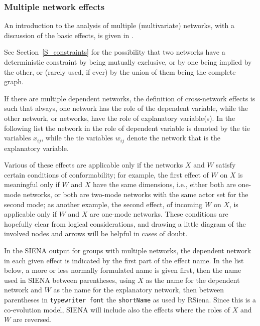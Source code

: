 \documentclass[a4paper,fleqn,11pt]{article}
\newcommand{\+}{\, + \,}
\newcommand{\rs}{{\sf RSiena}}
\newcommand{\SI}{{\sf SIENA }}
\begin{document}
\subsubsection{Multiple network effects}
\label{S_MultiNet}

An introduction to the analysis of multiple (multivariate) networks,
with a discussion of the basic effects, is given in \citet{SLT2013}.

See Section~\ref{S_constraints} for the possibility that two networks
have a deterministic constraint by being mutually exclusive,
or by one being implied by the other, or (rarely used, if ever)
by the union of them being the complete graph.

If there are multiple dependent networks, the definition of
cross-network effects is such that always, one network has the
role of the dependent variable, while the other network, or
networks, have the role of explanatory variable(s).
In the following list the network in the role of dependent variable
is denoted by the tie variables $x_{ij}$, while the
tie variables $w_{ij}$ denote the network that is the
explanatory variable.

Various of these effects are applicable only if the networks $X$
and $W$ satisfy certain conditions of conformability; for example,
the first effect of $W$ on $X$ is meaningful only if $W$ and $X$
have the same dimensions, i.e., either both are one-mode networks,
or both are two-mode networks with the same actor set for the second mode;
as another example, the second effect, of incoming $W$ on $X$,
is applicable only if $W$ and $X$ are one-mode networks.
These conditions are hopefully clear from logical considerations,
and drawing a little diagram of the involved nodes and arrows
will be helpful in cases of doubt.

In the \SI output for groups with multiple networks,
the dependent network in each given effect is indicated by
the first part of the effect name.
In the list below, a more or less normally formulated name is given first,
then the name used in \SI between parentheses,
using $X$ as the name for the dependent network and $W$
as the name for the explanatory network,
then between parentheses in \texttt{typewriter font} the \texttt{shortName}
as used by \rs.
Since this is a co-evolution model, \SI will include also the effects
where the roles of $X$ and $W$ are reversed.
\end{document}
